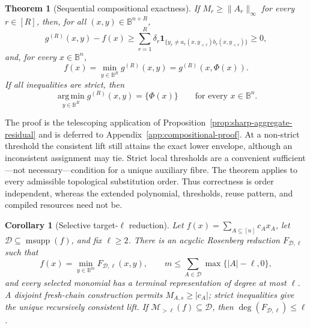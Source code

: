 \documentclass[a4paper,onecolumn,11pt,unpublished]{quantumarticle}
\newtheorem{theorem}[theorem]{Theorem}
\newtheorem{corollary}[corollary]{Corollary}
\theoremstyle{remark}
\begin{document}
\begin{theorem}[Sequential compositional exactness]
\label{thm:sequential-compositional-exactness}
If \(M_r\geq\|A_r\|_\infty\) for every \(r\in[R]\), then, for all
\((x,y)\in\mathbb B^{n+R}\),
\begin{equation}
  g^{(R)}(x,y)-f(x)
  \geq
  \sum_{r=1}^R\delta_r
  \mathbf 1_{\{y_r\neq
  a_r(x,y_{<r})b_r(x,y_{<r})\}}
  \geq0,
  \label{eq:compositional-gap}
\end{equation}
and, for every \(x\in\mathbb B^n\),
\begin{equation}
  f(x)=\min_{y\in\mathbb B^R}g^{(R)}(x,y)
      =g^{(R)}(x,\Phi(x)).
  \label{eq:compositional-exactness}
\end{equation}
If all inequalities are strict, then
\begin{equation}
  \operatorname*{arg\,min}_{y\in\mathbb B^R}g^{(R)}(x,y)
  =\{\Phi(x)\}
  \qquad\text{for every }x\in\mathbb B^n.
  \label{eq:strict-fibre-uniqueness}
\end{equation}
\end{theorem}

The proof is the telescoping application of
Proposition~\ref{prop:sharp-aggregate-residual} and is deferred to
Appendix~\ref{app:compositional-proof}.  At a non-strict threshold the
consistent lift still attains the exact lower envelope, although an
inconsistent assignment may tie.  Strict local thresholds are a convenient
sufficient---not necessary---condition for a unique auxiliary fibre.  The
theorem applies to every admissible
topological substitution order.  Thus correctness is order independent,
whereas the extended polynomial, thresholds, reuse pattern, and compiled
resources need not be.

\begin{corollary}[Selective target-\(\ell\) reduction]
\label{cor:selective-target-locality}
Let \(f(x)=\sum_{A\subseteq[n]}c_Ax_A\), let
\(\mathcal D\subseteq\operatorname{msupp}(f)\), and fix \(\ell\geq2\).
There is an acyclic Rosenberg reduction \(F_{\mathcal D,\ell}\) such that
\begin{equation}
  f(x)=\min_{y\in\mathbb B^m}F_{\mathcal D,\ell}(x,y),
  \qquad
  m\leq\sum_{A\in\mathcal D}\max\{|A|-\ell,0\},
  \label{eq:target-locality-bound}
\end{equation}
and every selected monomial has a terminal representation of degree at most
\(\ell\).  A disjoint fresh-chain construction permits
\(M_{A,s}\geq|c_A|\); strict inequalities give the unique recursively
consistent lift.  If \(\mathcal M_{>\ell}(f)\subseteq\mathcal D\), then
\(\deg(F_{\mathcal D,\ell})\leq\ell\).
\end{corollary}
\end{document}
